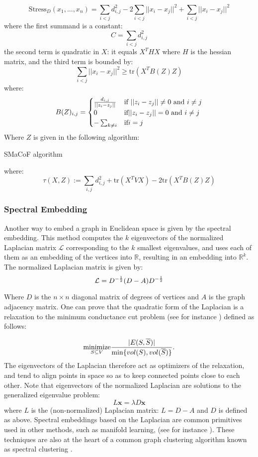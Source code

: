\[
  \text{Stress}_D(x_1, ... , x_n) = \sum_{i < j} d_{i,j}^2 - 2\sum_{i<j} ||x_i - x_j||^2 + \sum_{i<j} ||x_i - x_j||^2
\]
where the first summand is a constant:
\[
    C = \sum_{i < j} d_{i,j}^2
\]
the second term is quadratic in $X$: it equals $X^THX$ where $H$ is the hessian matrix, and the third term is bounded by:
\[
    \sum_{i<j} ||x_i - x_j||^2 \geq \text{tr}(X^TB(Z)Z)
\]
where:
\[
    B(Z)_{i,j} = \begin{cases} {d_{i,j}\over||z_i - z_j||} &\text{if }||z_i - z_j||\neq 0 \text{ and }i\neq j\\
    0 &\text{if} ||z_i - z_j|| = 0\text{ and }i \neq j\\
    -\sum_{k \neq i} &\text{if} i=j\end{cases}
\]
Where $Z$ is given in the following algorithm:

\begin{algorithm}[H]
\SetAlgoLined
{}
\caption{SMaCoF algorithm}
\end{algorithm}

where:
\[
  \tau(X,Z) := \sum_{i,j}d_{i,j}^2 + \text{tr}(X^T V X) - 2 \text{tr}(X^TB(Z)Z)
\]

\subsubsection*{Spectral Embedding}
Another way to embed a graph in Euclidean space is given by the spectral embedding. This method computes the $k$ eigenvectors of the normalized Laplacian matrix $\mathcal{L}$  corresponding to the $k$ smallest eigenvalues, and uses each of them as an embedding of the  vertices into $\mathbb{R}$, resulting in an  embedding into $\mathbb{R}^k$. The normalized Laplacian matrix is given by:
\[
    \mathcal{L} = D^{-{1\over 2}}(D - A)D^{-{1\over 2}}
\]

Where $D$ is the $n \times n$ diagonal matrix of degrees of vertices and $A$ is the graph adjacency matrix. One can prove that the quadratic form of the Laplacian is a relaxation to the minimum conductance cut problem (see for instance \cite{chung1997spectral}) defined as follows:

\[
    \underset{S  \subseteq V }{\text{minimize}} {|E(S,\overline{S})|\over \min\{vol(S), vol(\overline{S})\}}.
\]
The eigenvectors of the Laplacian therefore act as optimizers of the relaxation, and tend to align points in space so as to keep connected points close to each other. Note that eigenvectors of the normalized Laplacian are solutions to the generalized eigenvalue problem:
\[
    L\mathbf{x} = \lambda D\mathbf{x}
\]
where $L$ is the (non-normalized) Laplacian matrix: $L = D-A$ and $D$ is defined as above. Spectral embeddings based on the Laplacian are common primitives used in other methods, such as manifold learning, (see for instance \cite{belkin2003laplacian}). These techniques are also at the heart of a common graph clustering algorithm known as spectral clustering \cite{ng2002spectral}.

